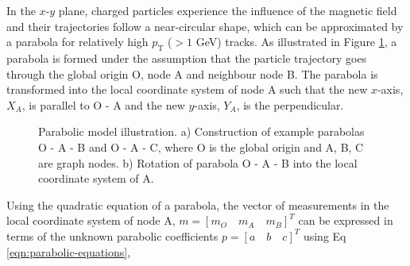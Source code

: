 In the $x$-$y$ plane, charged particles experience the influence of the magnetic field and their trajectories follow a near-circular shape, which can be approximated by a parabola for relatively high $p_{\text{T}}$ ($> 1$ GeV) tracks. As illustrated in Figure \ref{fig:gnn-parabolic-model}, a parabola is formed under the assumption that the particle trajectory goes through the global origin O, node A and neighbour node B. The parabola is transformed into the local coordinate system of node A such that the new $x$-axis, $X_A$, is parallel to O - A and the new $y$-axis, $Y_A$, is the perpendicular. 

\begin{figure}[htbp!] 
    \centering
    \hfill%
    \caption{Parabolic model illustration. a) Construction of example parabolas O - A - B and O - A - C, where O is the global origin and A, B, C are graph nodes. b) Rotation of parabola O - A - B into the local coordinate system of A.}
    \label{fig:gnn-parabolic-model}
\end{figure}


Using the quadratic equation of a parabola, the vector of measurements in the local coordinate system of node A, $ m = [m_O \quad m_A \quad m_B]^{T}$ can be expressed in terms of the unknown parabolic coefficients $p = [a \quad b \quad c]^{T}$ using Eq \eqref{eqn:parabolic-equations}, 

